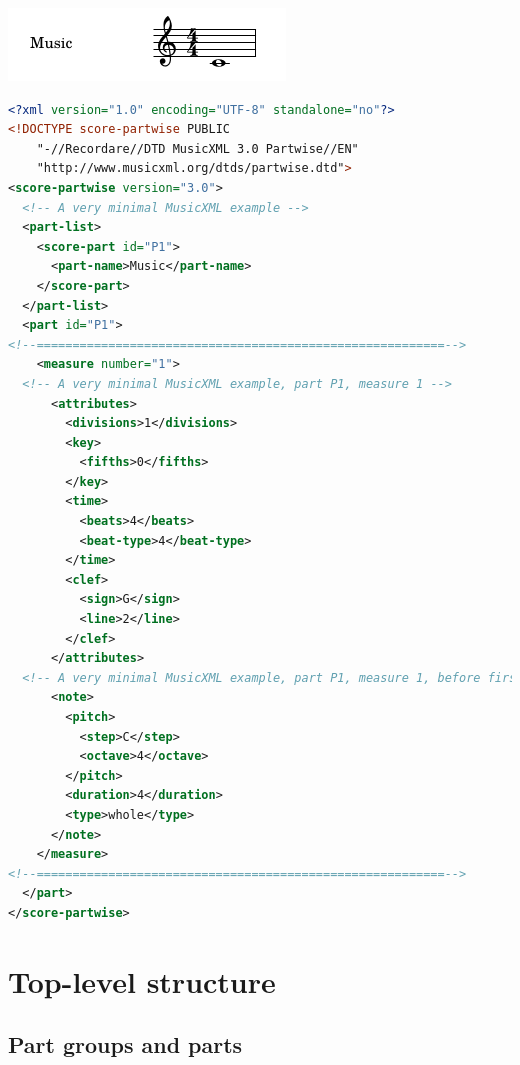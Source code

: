 \documentclass[12pt,a4paper]{article}
\begin{document}
\includegraphics{HelloWorld.png}

\begin{lstlisting}[language=XML, caption =HelloWorld.xml]
<?xml version="1.0" encoding="UTF-8" standalone="no"?>
<!DOCTYPE score-partwise PUBLIC
    "-//Recordare//DTD MusicXML 3.0 Partwise//EN"
    "http://www.musicxml.org/dtds/partwise.dtd">
<score-partwise version="3.0">
  <!-- A very minimal MusicXML example -->
  <part-list>
    <score-part id="P1">
      <part-name>Music</part-name>
    </score-part>
  </part-list>
  <part id="P1">
<!--=========================================================-->
    <measure number="1">
  <!-- A very minimal MusicXML example, part P1, measure 1 -->
      <attributes>
        <divisions>1</divisions>
        <key>
          <fifths>0</fifths>
        </key>
        <time>
          <beats>4</beats>
          <beat-type>4</beat-type>
        </time>
        <clef>
          <sign>G</sign>
          <line>2</line>
        </clef>
      </attributes>
  <!-- A very minimal MusicXML example, part P1, measure 1, before first note -->
      <note>
        <pitch>
          <step>C</step>
          <octave>4</octave>
        </pitch>
        <duration>4</duration>
        <type>whole</type>
      </note>
    </measure>
<!--=========================================================-->
  </part>
</score-partwise>
\end{lstlisting}

\section{Top-level structure}

\subsection{Part groups and parts}
\end{document}
